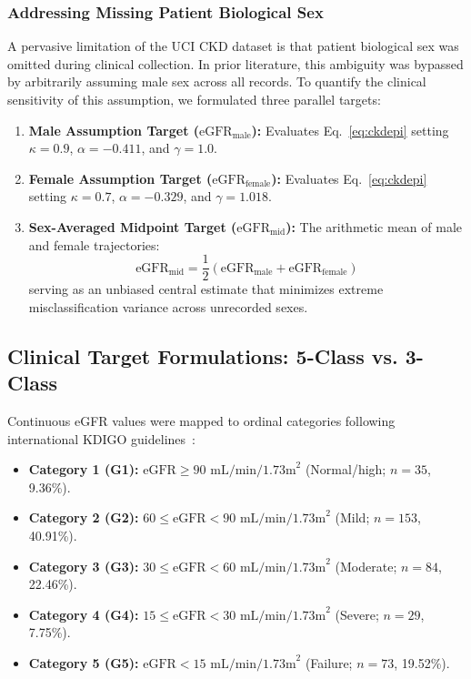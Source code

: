 \documentclass[conference]{IEEEtran}
\begin{document}
\subsubsection{Addressing Missing Patient Biological Sex}
A pervasive limitation of the UCI CKD dataset is that patient biological sex was omitted during clinical collection. In prior literature, this ambiguity was bypassed by arbitrarily assuming male sex across all records. To quantify the clinical sensitivity of this assumption, we formulated three parallel targets:
\begin{enumerate}
    \item \textbf{Male Assumption Target ($\text{eGFR}_{\text{male}}$):} Evaluates Eq.~\ref{eq:ckdepi} setting $\kappa = 0.9$, $\alpha = -0.411$, and $\gamma = 1.0$.
    \item \textbf{Female Assumption Target ($\text{eGFR}_{\text{female}}$):} Evaluates Eq.~\ref{eq:ckdepi} setting $\kappa = 0.7$, $\alpha = -0.329$, and $\gamma = 1.018$.
    \item \textbf{Sex-Averaged Midpoint Target ($\text{eGFR}_{\text{mid}}$):} The arithmetic mean of male and female trajectories:
    \begin{equation}
    \text{eGFR}_{\text{mid}} = \frac{1}{2} \left( \text{eGFR}_{\text{male}} + \text{eGFR}_{\text{female}} \right)
    \end{equation}
    serving as an unbiased central estimate that minimizes extreme misclassification variance across unrecorded sexes.
\end{enumerate}



\subsection{Clinical Target Formulations: 5-Class vs. 3-Class}
Continuous eGFR values were mapped to ordinal categories following international KDIGO guidelines~\cite{kdigo2013}:
\begin{itemize}
    \item \textbf{Category 1 (G1):} $\text{eGFR} \ge 90\text{ mL/min/1.73m}^2$ (Normal/high; $n = 35$, 9.36\%).
    \item \textbf{Category 2 (G2):} $60 \le \text{eGFR} < 90\text{ mL/min/1.73m}^2$ (Mild; $n = 153$, 40.91\%).
    \item \textbf{Category 3 (G3):} $30 \le \text{eGFR} < 60\text{ mL/min/1.73m}^2$ (Moderate; $n = 84$, 22.46\%).
    \item \textbf{Category 4 (G4):} $15 \le \text{eGFR} < 30\text{ mL/min/1.73m}^2$ (Severe; $n = 29$, 7.75\%).
    \item \textbf{Category 5 (G5):} $\text{eGFR} < 15\text{ mL/min/1.73m}^2$ (Failure; $n = 73$, 19.52\%).
\end{itemize}
\end{document}
